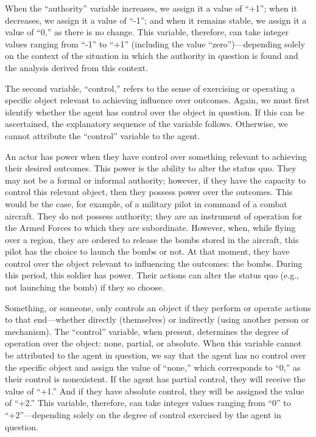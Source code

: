 When the ``authority'' variable increases, we assign it a value of ``+1''; when it decreases, we assign it a value of ``-1''; and when it remains stable, we assign it a value of ``0,'' as there is no change. This variable, therefore, can take integer values ranging from ``-1'' to ``+1'' (including the value ``zero'')---depending solely on the context of the situation in which the authority in question is found and the analysis derived from this context.

The second variable, ``control,'' refers to the sense of exercising or operating a specific object relevant to achieving influence over outcomes. Again, we must first identify whether the agent has control over the object in question. If this can be ascertained, the explanatory sequence of the variable follows. Otherwise, we cannot attribute the ``control'' variable to the agent.

An actor has power when they have control over something relevant to achieving their desired outcomes. This power is the ability to alter the status quo. They may not be a formal or informal authority; however, if they have the capacity to control this relevant object, then they possess power over the outcomes. This would be the case, for example, of a military pilot in command of a combat aircraft. They do not possess authority; they are an instrument of operation for the Armed Forces to which they are subordinate. However, when, while flying over a region, they are ordered to release the bombs stored in the aircraft, this pilot has the choice to launch the bombs or not. At that moment, they have control over the object relevant to influencing the outcomes: the bombs. During this period, this soldier has power. Their actions can alter the status quo (e.g., not launching the bomb) if they so choose.

Something, or someone, only controls an object if they perform or operate actions to that end---whether directly (themselves) or indirectly (using another person or mechanism). The ``control'' variable, when present, determines the degree of operation over the object: none, partial, or absolute. When this variable cannot be attributed to the agent in question, we say that the agent has no control over the specific object and assign the value of ``none,'' which corresponds to ``0,'' as their control is nonexistent. If the agent has partial control, they will receive the value of ``+1.'' And if they have absolute control, they will be assigned the value of ``+2.'' This variable, therefore, can take integer values ranging from ``0'' to ``+2''---depending solely on the degree of control exercised by the agent in question.

